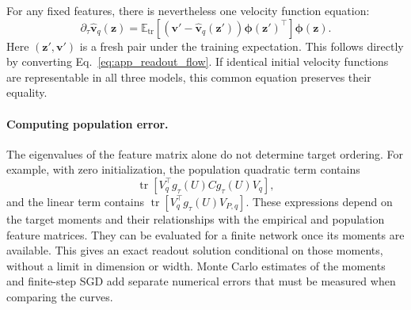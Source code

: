 For any fixed features, there is nevertheless one velocity function equation:
\begin{equation}
 \partial_\tau\widehat{\mathbf v}_q(\mathbf z)
 =\mathbb E_{\mathrm{tr}}\!\left[
 (\mathbf v'-\widehat{\mathbf v}_q(\mathbf z'))
 \boldsymbol\phi(\mathbf z')^\top\right]\boldsymbol\phi(\mathbf z).
 \label{eq:app_function_flow}
\end{equation}
Here $(\mathbf z',\mathbf v')$ is a fresh pair under the training expectation.
This follows directly by converting Eq.~\eqref{eq:app_readout_flow}.
If identical initial velocity functions are representable in all three
models, this common equation preserves their equality.

\paragraph{Computing population error.}
The eigenvalues of the feature matrix alone do not determine target
ordering. For example, with zero initialization, the population quadratic
term contains
\[
 \operatorname{tr}\!\left[V_q^\top g_\tau(U)C g_\tau(U)V_q\right],
\]
and the linear term contains
$\operatorname{tr}[V_q^\top g_\tau(U)V_{P,q}]$.
These expressions depend on the target moments and their relationships
with the empirical and population feature matrices. They can be evaluated
for a finite network once its moments are available. This gives an exact
readout solution conditional on those moments, without a limit in dimension
or width. Monte Carlo estimates of the moments and finite-step SGD add
separate numerical errors that must be measured when comparing the curves.
